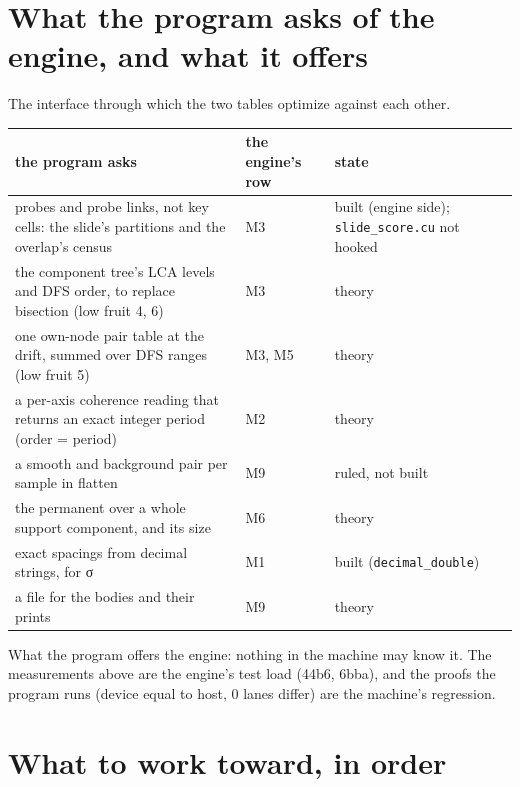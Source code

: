 \section{\texorpdfstring{What the program asks of the engine, and what it offers}{What the program asks of the engine, and what it offers}}

The interface through which the two tables optimize against each other.

{\small
\setlength{\tabcolsep}{6pt}
\begin{longtable}{>{\RaggedRight\arraybackslash}p{}>{\RaggedRight\arraybackslash}p{}>{\RaggedRight\arraybackslash}p{}}
\toprule
the program asks & the engine's row & state \\
\midrule
\endhead
probes and probe links, not key cells: the slide's partitions and the overlap's census & M3 & built (engine side); \texttt{slide\_\allowbreak{}score.\allowbreak{}cu} not hooked \\
the component tree's LCA levels and DFS order, to replace bisection (low fruit 4, 6) & M3 & theory \\
one own-node pair table at the drift, summed over DFS ranges (low fruit 5) & M3, M5 & theory \\
a per-axis coherence reading that returns an exact integer period (order = period) & M2 & theory \\
a smooth and background pair per sample in flatten & M9 & ruled, not built \\
the permanent over a whole support component, and its size & M6 & theory \\
exact spacings from decimal strings, for σ & M1 & built (\texttt{decimal\_\allowbreak{}double}) \\
a file for the bodies and their prints & M9 & theory \\
\bottomrule
\end{longtable}
}

What the program offers the engine: nothing in the machine may know it. The measurements above are the engine's test load (44b6, 6bba), and the proofs the program runs (device equal to host, 0 lanes differ) are the machine's regression.

\section{\texorpdfstring{What to work toward, in order}{What to work toward, in order}}

